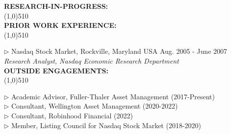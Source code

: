 \documentclass[11pt]{article}
\begin{document}
\vskip 0.75cm
\setlength{\parindent}{0in}
{\bf RESEARCH-IN-PROGRESS:\\}
\vskip -0.85cm \line(1,0){510} \\ 

 




\vskip 0.75cm
\setlength{\parindent}{0in}
{\bf PRIOR WORK EXPERIENCE:\\}
\vskip -0.85cm \line(1,0){510} \\ \vskip -0.35cm

$\triangleright$ Nasdaq Stock Market, Rockville, Maryland USA \hfill Aug. 2005 - June 2007\\
{\em Research Analyst, Nasdaq Economic Research Department}\\

\vskip 0.5cm
\setlength{\parindent}{0in}
{\bf OUTSIDE ENGAGEMENTS:\\}
\vskip -0.85cm \line(1,0){510} \\ \vskip -0.35cm

$\triangleright$ Academic Advisor, Fuller-Thaler Asset Management (2017-Present)\\
$\triangleright$ Consultant, Wellington Asset Management (2020-2022)\\
$\triangleright$ Consultant, Robinhood Financial (2022)\\
$\triangleright$ Member, Listing Council for Nasdaq Stock Market (2018-2020)


\vskip 0.25cm
\end{document}
